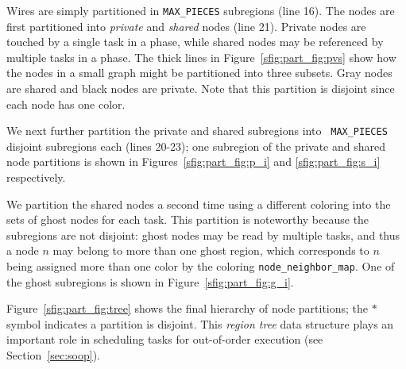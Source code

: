 Wires are simply partitioned in {\tt MAX\_PIECES} subregions (line 16).  
The nodes are first partitioned into 
{\em private} and {\em shared} nodes (line 21).  Private nodes
are touched by a single task in a phase, while shared nodes may
be referenced by multiple tasks in a phase.  The thick lines in Figure~\ref{sfig:part_fig:pvs}
show how the nodes in a small graph might be partitioned into three subsets.  Gray
nodes are shared and black nodes are private.  Note that
this partition is disjoint since each node has one color.

We next further partition the private and shared subregions into {\tt
  MAX\_PIECES} disjoint subregions each (lines 20-23); one subregion
of the private and shared node partitions is shown in
Figures~\ref{sfig:part_fig:p_i} and \ref{sfig:part_fig:s_i}
respectively.  

We partition the shared nodes a second time using a
different coloring into the sets of ghost nodes for each task.  This 
partition is noteworthy because the subregions are not disjoint:
ghost nodes may be read by multiple tasks, and thus a node $n$  may belong 
to more than one ghost region, which corresponds to $n$ being assigned
more than one color by the coloring {\tt node\_neighbor\_map}.
One of the ghost subregions is shown in Figure~\ref{sfig:part_fig:g_i}.

Figure~\ref{sfig:part_fig:tree} shows the final hierarchy of node
partitions;  the $*$ symbol indicates a partition is disjoint. This
{\em region tree} data structure plays an important role in scheduling
tasks for out-of-order execution (see Section~\ref{sec:soop}).



